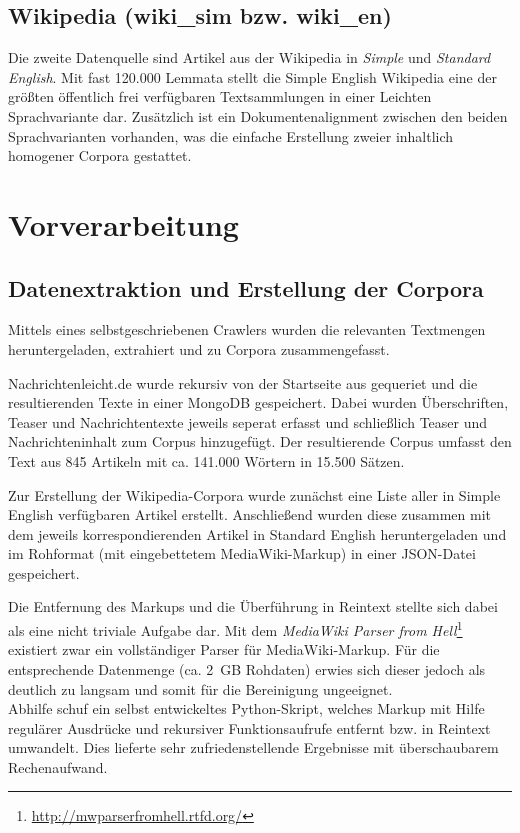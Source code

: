 \documentclass[11pt, a4paper]{article}
\begin{document}
\subsection{Wikipedia (wiki\_sim bzw. wiki\_en)}
\label{corp-wiki}
Die zweite Datenquelle sind Artikel aus der Wikipedia in \emph{Simple} und
\emph{Standard English}. Mit fast 120.000 Lemmata stellt die Simple English
Wikipedia eine der gr\"o\ss{}ten \"offentlich frei verf\"ugbaren Textsammlungen
in einer Leichten Sprachvariante dar.
Zus\"atzlich ist ein Dokumentenalignment zwischen den beiden Sprachvarianten
vorhanden, was die einfache Erstellung zweier inhaltlich homogener Corpora
gestattet.


\section{Vorverarbeitung}
\label{sec:vorverarb}

\subsection{Datenextraktion und Erstellung der Corpora}
\label{datextr}

Mittels eines selbstgeschriebenen Crawlers wurden die relevanten Textmengen
heruntergeladen, extrahiert und zu Corpora zusammengefasst.

Nachrichtenleicht.de wurde rekursiv von der Startseite aus gequeriet
und die resultierenden Texte in einer MongoDB gespeichert.
Dabei wurden Überschriften, Teaser und Nachrichtentexte jeweils seperat erfasst
und schließlich Teaser und Nachrichteninhalt zum Corpus hinzugefügt.
Der resultierende Corpus umfasst den Text aus 845 Artikeln mit ca. 141.000
Wörtern in 15.500 Sätzen.

Zur Erstellung der Wikipedia-Corpora wurde zunächst eine Liste aller
in Simple English verfügbaren Artikel erstellt. Anschließend wurden diese
zusammen mit dem jeweils korrespondierenden Artikel in Standard English
heruntergeladen und im Rohformat (mit eingebettetem MediaWiki-Markup) in einer
JSON-Datei gespeichert.

Die Entfernung des Markups und die Überführung in Reintext stellte
sich dabei als eine nicht triviale Aufgabe dar.
Mit dem \emph{MediaWiki Parser from
Hell}\footnote{\url{http://mwparserfromhell.rtfd.org/}} existiert zwar ein
vollständiger Parser für MediaWiki-Markup.
Für die entsprechende Datenmenge (ca. 2~GB Rohdaten) erwies sich dieser jedoch
als deutlich zu langsam und somit für die Bereinigung ungeeignet.
\\
Abhilfe schuf ein selbst entwickeltes Python-Skript, welches Markup mit Hilfe
regul\"arer Ausdr\"ucke und rekursiver Funktionsaufrufe entfernt bzw. in
Reintext umwandelt.
Dies lieferte sehr zufriedenstellende Ergebnisse mit überschaubarem
Rechenaufwand.
\end{document}

